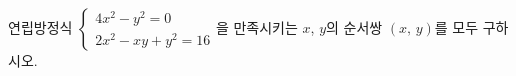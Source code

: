 연립방정식 $\begin{cases} 4x^2-y^2=0 \\ 2x^2-xy+y^2=16 \end{cases}$을 만족시키는 $x$, $y$의 순서쌍 $(x,\,y)$를 모두 구하시오.
